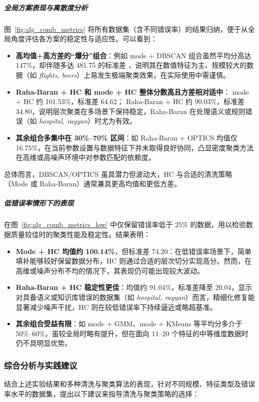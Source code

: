 \documentclass[10pt]{article} %
\numberwithin{equation}{section}
\begin{document}
\subparagraph{全局方案表现与离散度分析}
图~\ref{fig:alg_comb_metrics} 将所有数据集（含不同错误率）的结果归纳，便于从全局角度评估各方案的稳定性与适应性。可以看到：
\begin{itemize}
    \item \textbf{高均值+高方差的“爆分”组合}：例如 mode + DBSCAN 组合虽然平均分高达 147\%，却伴随多达 481.75 的标准差 ，说明其在数值特征为主、规模较大的数据（如 \textit{flights, beers}）上易发生极端聚类效果，在实际使用中需谨慎。
    \item \textbf{Raha-Baran + HC 和 mode + HC 整体分数高且方差相对适中}：  mode + HC 约 101.53\%，标准差 64.62； Raha-Baran + HC 约 90.03\%，标准差 34.80，说明层次聚类在多场景下保持稳定，Raha-Baran 在处理语义或规则错误（如 \textit{hospital, rayyan}）时尤为有效。
    \item \textbf{其余组合多集中在 30\%--70\% 区间}：如 Raha-Baran + OPTICS 均值仅 16.75\%，在当前参数设置与数据特征下并未取得良好协同，凸显密度聚类方法在高维或高噪声环境中对参数匹配的依赖度。
\end{itemize}
总体而言，DBSCAN/OPTICS 虽具潜力但波动大，HC 与合适的清洗策略（Mode 或 Raha-Baran）通常兼具更高均值和更低方差。

\subparagraph{低错误率情形下的表现}
在图~\ref{fig:alg_comb_metrics_low} 中仅保留错误率低于 25\% 的数据，用以检验数据质量较佳时的聚类性能及稳定性。结果表明：
\begin{itemize}
    \item \textbf{Mode + HC 均值约 100.14\%}，但标准差 74.20：在低错误率场景下，简单填补能够较好保留数据分布，HC 则通过合适的层次切分实现高分。然而，在高维或噪声分布不均的情况下，其表现仍可能出现较大波动。
    \item \textbf{Raha-Baran + HC 稳定性更佳}：均值约 91.04\%，标准差降至 20.04，显示对具备语义或知识库错误的数据集（如 \textit{hospital, rayyan}）而言，精细化修复能显著减少噪声干扰，HC 则在较低错误率下持续逼近或略超基准。
    \item \textbf{其余组合受益有限}：如 mode + GMM、mode + KMeans 等平均分多介于 50\%--60\%，虽较全局时略有提升，但在面向 11--20 个特征的中等维度数据时仍不具明显优势。
\end{itemize}

\subsubsection{综合分析与实践建议}
结合上述实验结果和多种清洗与聚类算法的表现，针对不同规模、特征类型及错误率水平的数据集，提出以下建议来指导清洗与聚类策略的选择：
\end{document}
